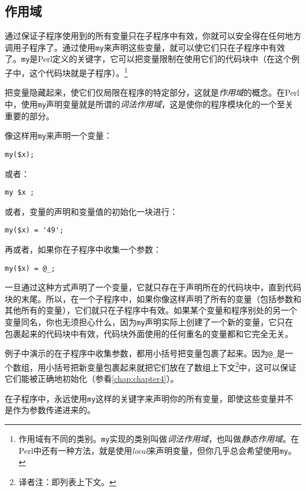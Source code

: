 \subsection{作用域}
通过保证子程序使用到的所有变量只在子程序中有效，你就可以安全得在任何地方调用子程序了。通过使用\verb|my|来声明这些变量，就可以使它们只在子程序中有效了。\verb|my|是Perl定义的关键字，它可以把变量限制在使用它们的代码块中（在这个例子中，这个代码块就是子程序）。\footnote{作用域有不同的类别。\verb|my|实现的类别叫做\textit{词法作用域}，也叫做\textit{静态作用域}。在Perl中还有一种方法，就是使用\textit{local}来声明变量，但你几乎总会希望使用\verb|my|。} 

把变量隐藏起来，使它们仅局限在程序的特定部分，这就是\textit{作用域}的概念。在Perl中，使用\verb|my|声明变量就是所谓的\textit{词法作用域}，这是使你的程序模块化的一个至关重要的部分。

像这样用\verb|my|来声明一个变量：

\begin{lstlisting}
my($x); 
\end{lstlisting}

或者：

\begin{lstlisting}
my $x ; 
\end{lstlisting}

或者，变量的声明和变量值的初始化一块进行：

\begin{lstlisting}
my($x) = '49'; 
\end{lstlisting}

再或者，如果你在子程序中收集一个参数：

\begin{lstlisting}
my($x) = @_; 
\end{lstlisting}

一旦通过这种方式声明了一个变量，它就只存在于声明所在的代码块中，直到代码块的末尾。所以，在一个子程序中，如果你像这样声明了所有的变量（包括参数和其他所有的变量），它们就只在子程序中有效。如果某个变量和程序别处的另一个变量同名，你也无须担心什么，因为\verb|my|声明实际上创建了一个新的变量，它只在包裹起来的代码块中有效，代码块外面使用的任何重名的变量都和它完全无关。

例子中演示的在子程序中收集参数，都用小括号把变量包裹了起来。因为\verb|@_|是一个数组，用小括号把新变量包裹起来就把它们放在了数组上下文\footnote{译者注：即列表上下文。}中，这可以保证它们能被正确地初始化（参看\autoref{chap:chapter4}）。

\begin{adjustwidth}{4em}{4em}
\noindent
在子程序中，永远使用\verb|my|这样的关键字来声明你的所有变量，即使这些变量并不是作为参数传递进来的。
\end{adjustwidth}


